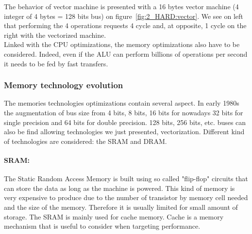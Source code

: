 The behavior of vector machine is presented with a 16 bytes vector machine (4 integer of 4 bytes = 128 bits bus) on figure~\ref{fig:2_HARD:vector}. We see on left that performing the 4 operations requests 4 cycle and, at opposite, 1 cycle on the right with the vectorized machine.\\

Linked with the CPU optimizations, the memory optimizations also have to be considered. 
Indeed, even if the ALU can perform billions of operations per second it needs to be fed by fast transfers.

\subsubsection{Memory technology evolution}

The memories technologies optimizations contain several aspect. 
In early 1980s the augmentation of bus size from 4 bits, 8 bits, 16 bits for nowadays 32 bits for single precision and 64 bits for double precision. 
128 bits, 256 bits, etc. buses can also be find allowing technologies we just presented, vectorization. 
Different kind of technologies are considered: the SRAM and DRAM. 

\paragraph{SRAM: }
The Static Random Access Memory is built using so called "flip-flop" circuits that can store the data as long as the machine is powered. 
This kind of memory is very expensive to produce due to the number of transistor by memory cell needed and the size of the memory.
Therefore it is usually limited for small amount of storage. 
The SRAM is mainly used for cache memory. 
Cache is a memory mechanism that is useful to consider when targeting performance. 

